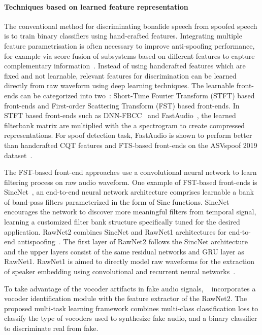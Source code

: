 \paragraph{Techniques based on learned feature representation}
The conventional method for discriminating bonafide speech from spoofed speech is to train binary classifiers using hand-crafted features. Integrating multiple feature parametrisation is often necessary to improve anti-spoofing performance, for example via score fusion of subsystems based on different features to capture complementary information~\cite{zwu2017}.
Instead of using handcrafted features which are fixed and not learnable, relevant features for discrimination can be learned directly from raw waveform using deep learning techniques. The learnable front-ends can be categorized into two~\cite{fastaudio}: Short-Time Fourier Transform (STFT) based front-ends and First-order Scattering Transform (FST) based front-ends. In STFT based front-ends such as DNN-FBCC~\cite{dnn-fbank} and FastAudio~\cite{fastaudio}, the learned filterbank matrix are multiplied with the a spectrogram to create compressed representations.  For spoof detection task, FastAudio is shown to perform better than handcrafted CQT features and FTS-based front-ends on the ASVspoof 2019 dataset~\cite{fastaudio}.

The FST-based front-end approaches use a convolutional neural network to learn filtering process on raw audio waveform. 
One example of FST-based front-ends is SincNet~\cite{sincnet}, an end-to-end neural network architecture comprises %
learnable a bank of band-pass filters parameterized in the form of Sinc functions. SincNet encourages the network to discover more meaningful filters from temporal signal, learning a customized filter bank structure specifically tuned for the desired application. 
RawNet2 combines SincNet and RawNet1 architectures for end-to-end antispoofing~\cite{tak2021}. The first layer of RawNet2 follows the SincNet architecture and the upper layers consist of the same residual networks and GRU layer as RawNet1. RawNet1 is aimed to directly model raw waveforms for the extraction of speaker embedding using convolutional and recurrent neural networks~\cite{jung2019RawNet}. 

To take advantage of the vocoder artifacts in fake audio signals, ~\cite{sun2023} incorporates a vocoder identification module with the feature extractor of the RawNet2. The proposed multi-task learning framework combines multi-class classification loss to classify the type of vocoders used to synthesize fake audio, and a binary classifier to discriminate real from fake. 

